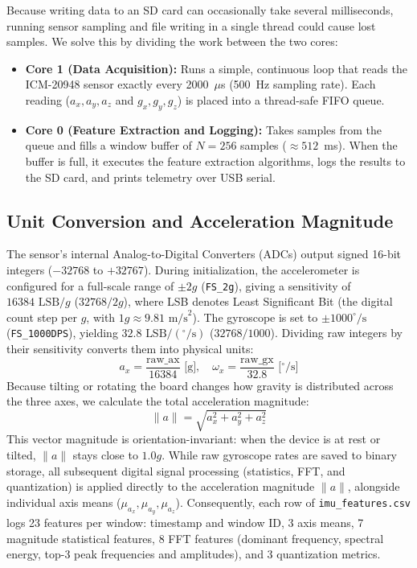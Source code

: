 \documentclass[conference]{IEEEtran}
\begin{document}
Because writing data to an SD card can occasionally take several milliseconds, running sensor sampling and file writing in a single thread could cause lost samples. We solve this by dividing the work between the two cores:
\begin{itemize}
    \item \textbf{Core 1 (Data Acquisition):} Runs a simple, continuous loop that reads the ICM-20948 sensor exactly every 2000~$\mu$s (500~Hz sampling rate). Each reading ($a_x, a_y, a_z$ and $g_x, g_y, g_z$) is placed into a thread-safe FIFO queue.
    \item \textbf{Core 0 (Feature Extraction and Logging):} Takes samples from the queue and fills a window buffer of $N = 256$ samples ($\approx 512$~ms). When the buffer is full, it executes the feature extraction algorithms, logs the results to the SD card, and prints telemetry over USB serial.
\end{itemize}

\subsection{Unit Conversion and Acceleration Magnitude}
The sensor's internal Analog-to-Digital Converters (ADCs) output signed 16-bit integers ($-32768$ to $+32767$). During initialization, the accelerometer is configured for a full-scale range of $\pm 2g$ (\texttt{FS\_2g}), giving a sensitivity of $16384\text{ LSB}/g$ ($32768 / 2g$), where LSB denotes Least Significant Bit (the digital count step per $g$, with $1g \approx 9.81\text{ m/s}^2$). The gyroscope is set to $\pm 1000^\circ/\text{s}$ (\texttt{FS\_1000DPS}), yielding $32.8\text{ LSB}/(^\circ/\text{s})$ ($32768 / 1000$). Dividing raw integers by their sensitivity converts them into physical units:
\begin{equation}
a_{x} = \frac{\text{raw\_ax}}{16384} \text{ [g]}, \quad \omega_{x} = \frac{\text{raw\_gx}}{32.8} \text{ [$^\circ$/s]}
\end{equation}
Because tilting or rotating the board changes how gravity is distributed across the three axes, we calculate the total acceleration magnitude:
\begin{equation}
\|a\| = \sqrt{a_x^2 + a_y^2 + a_z^2}
\end{equation}
This vector magnitude is orientation-invariant: when the device is at rest or tilted, $\|a\|$ stays close to $1.0g$. While raw gyroscope rates are saved to binary storage, all subsequent digital signal processing (statistics, FFT, and quantization) is applied directly to the acceleration magnitude $\|a\|$, alongside individual axis means ($\mu_{a_x}, \mu_{a_y}, \mu_{a_z}$). Consequently, each row of \texttt{imu\_features.csv} logs 23 features per window: timestamp and window ID, 3 axis means, 7 magnitude statistical features, 8 FFT features (dominant frequency, spectral energy, top-3 peak frequencies and amplitudes), and 3 quantization metrics.
\end{document}
